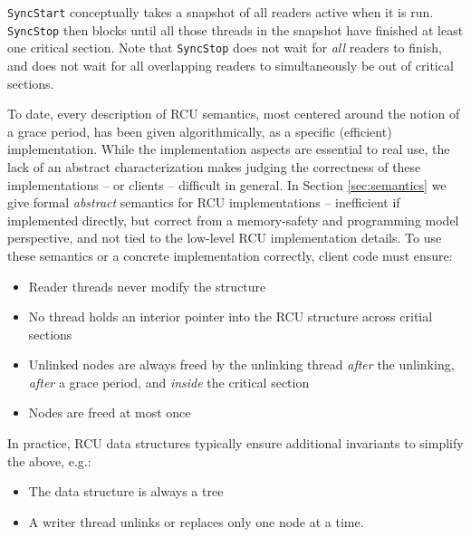 \lstinline|SyncStart| conceptually takes a snapshot of all readers active when it is run.
\lstinline|SyncStop| then blocks until all those threads in the snapshot have finished at least one critical section.
Note that \lstinline|SyncStop| does not wait for \emph{all} readers to finish, and does not wait for all overlapping readers to simultaneously be out of critical sections.

To date, every description of RCU semantics, most centered around the notion of a grace period, has been given algorithmically, as a specific (efficient) implementation.  While the implementation aspects are essential to real use, the lack of an abstract characterization makes judging the correctness of these implementations -- or clients -- difficult in general. In Section \ref{sec:semantics} we give formal \emph{abstract} semantics for RCU implementations -- inefficient if implemented directly, but correct from a memory-safety and programming model perspective, and not tied to the low-level RCU implementation details.
To use these semantics or a concrete implementation correctly, client code must ensure:
\begin{itemize}
\item Reader threads never modify the structure
\item No thread holds an interior pointer into the RCU structure across critial sections
\item Unlinked nodes are always freed by the unlinking thread \emph{after} the unlinking, \emph{after} a grace period, and \emph{inside} the critical section
\item Nodes are freed at most once
\end{itemize}
In practice, RCU data structures typically ensure additional invariants to simplify the above, e.g.:
\begin{itemize}
\item The data structure is always a tree
\item A writer thread unlinks or replaces only one node at a time. 
\end{itemize}
